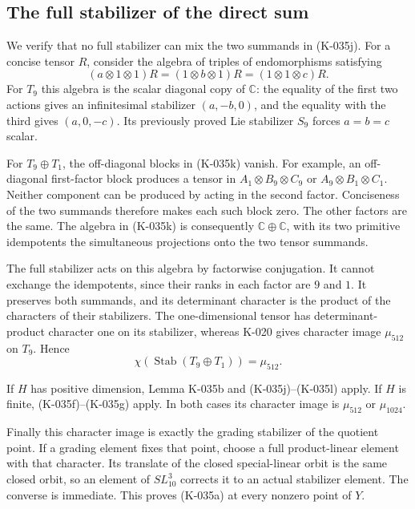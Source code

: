 \subsection*{The full stabilizer of the direct sum}

We verify that no full stabilizer can mix the two summands in
(K-035j).  For a concise tensor $R$, consider the algebra of
triples of endomorphisms satisfying
\[
 (a\otimes1\otimes1)R=(1\otimes b\otimes1)R
                         =(1\otimes1\otimes c)R.        \tag{K-035k}
\]
For $T_9$ this algebra is the scalar diagonal copy of $\mathbb C$:
the equality of the first two actions gives an infinitesimal
stabilizer $(a,-b,0)$, and the equality with the third gives
$(a,0,-c)$.  Its previously proved Lie stabilizer $S_9$ forces
$a=b=c$ scalar.

For $T_9\oplus T_1$, the off-diagonal blocks in (K-035k) vanish.
For example, an off-diagonal first-factor block produces a tensor
in $A_1\otimes B_9\otimes C_9$ or
$A_9\otimes B_1\otimes C_1$.  Neither component can be produced
by acting in the second factor.  Conciseness of the two summands
therefore makes each such block zero.  The other factors are
the same.  The algebra in (K-035k) is consequently
$\mathbb C\oplus\mathbb C$, with its two primitive idempotents
the simultaneous projections onto the two tensor summands.

The full stabilizer acts on this algebra by factorwise
conjugation.  It cannot exchange the idempotents, since their
ranks in each factor are $9$ and $1$.  It preserves both
summands, and its determinant character is the product of the
characters of their stabilizers.  The one-dimensional tensor
has determinant-product character one on its stabilizer, whereas
K-020 gives character image $\mu_{512}$ on $T_9$.  Hence
\[
                 \chi(\operatorname{Stab}(T_9\oplus T_1))
                               =\mu_{512}.              \tag{K-035l}
\]

If $H$ has positive dimension, Lemma K-035b and (K-035j)--(K-035l)
apply.  If $H$ is finite, (K-035f)--(K-035g) apply.  In both
cases its character image is $\mu_{512}$ or $\mu_{1024}$.

Finally this character image is exactly the grading stabilizer
of the quotient point.  If a grading element fixes that point,
choose a full product-linear element with that character.  Its
translate of the closed special-linear orbit is the same closed
orbit, so an element of $SL_{10}^3$ corrects it to an actual
stabilizer element.  The converse is immediate.  This proves
(K-035a) at every nonzero point of $Y$.

